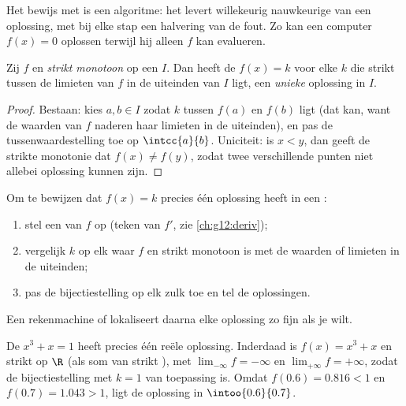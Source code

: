 \begin{remark}
Het bewijs met  is een algoritme: het levert willekeurig nauwkeurige
 van een oplossing, met bij elke stap een halvering van de fout.
Zo kan een computer $f(x) = 0$ oplossen terwijl hij alleen $f$ kan evalueren.
\end{remark}

\begin{theorem}[Bijectiestelling]\label{thm:g12:limcont:bijection}
Zij $f$  en \emph{strikt monotoon} op een  $I$. Dan heeft de
 $f(x) = k$ voor elke $k$ die strikt tussen de limieten van $f$
in de uiteinden van $I$ ligt, een \emph{unieke} oplossing in $I$.
\end{theorem}

\begin{proof}
Bestaan: kies $a, b \in I$ zodat $k$ tussen $f(a)$ en $f(b)$ ligt (dat kan,
want de waarden van $f$ naderen haar limieten in de uiteinden), en pas de
tussenwaardestelling toe op $\intcc{a}{b}$. Uniciteit: is $x < y$, dan geeft
de strikte monotonie dat $f(x) \neq f(y)$, zodat twee verschillende punten
niet allebei oplossing kunnen zijn.
\end{proof}

\begin{method}[$f(x) = k$ oplossen met de bijectiestelling]\label{met:g12:limcont:bijection}
Om te bewijzen dat $f(x) = k$ precies één oplossing heeft in een :
\begin{enumerate}
  \item stel een  van $f$ op (teken van $f'$, zie
        \cref{ch:g12:deriv});
  \item vergelijk $k$ op elk  waar $f$  en strikt monotoon is
        met de waarden of limieten in de uiteinden;
  \item pas de bijectiestelling op elk zulk  toe en tel de
        oplossingen.
\end{enumerate}
Een rekenmachine of  lokaliseert daarna elke oplossing zo fijn als je
wilt.
\end{method}

\begin{example}\label{ex:g12:limcont:cubic}
De  $x^3 + x = 1$ heeft precies één reële oplossing. Inderdaad is
$f(x) = x^3 + x$  en strikt  op $\R$ (als som van strikt
), met $\lim_{-\infty} f = -\infty$ en
$\lim_{+\infty} f = +\infty$, zodat de bijectiestelling met $k = 1$ van
toepassing is. Omdat $f(0.6) = 0.816 < 1$ en $f(0.7) = 1.043 > 1$, ligt de
oplossing in $\intoo{0.6}{0.7}$.
\end{example}

